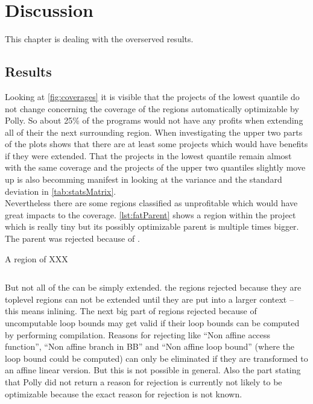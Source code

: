 \chapter{Discussion}
This chapter is dealing with the overserved results.

\section{Results}
Looking at \autoref{fig:coverages} it is visible that the projects of the lowest quantile do not change concerning the coverage of the regions automatically optimizable by Polly.
So about 25\% of the programs would not have any profits when extending all of their \scops the next surrounding region.
When investigating the upper two parts of the plots shows that there are at least some projects which would have benefits if they were extended.
That the projects in the lowest quantile remain almost with the same coverage and the projects of the upper two quantiles slightly move up is also becomming manifest in looking at the variance and the standard deviation in \autoref{tab:statsMatrix}.\\
Nevertheless there are some regions classified as unprofitable which would have great impacts to the coverage.
\autoref{lst:fatParent} shows a region within the project  which is really tiny but its possibly optimizable parent is multiple times bigger.
The parent was rejected because of .\\
\begin{code}
    \caption{A region of XXX}
    \inputminted{c++}{cpp/fatParent.cpp}
    \label{lst:fatParent}
\end{code}
But not all of the \scops can be simply extended.
\Eg the regions rejected because they are toplevel regions can not be extended until they are put into a larger context -- this means inlining.
The next big part of regions rejected because of uncomputable loop bounds may get valid if their loop bounds can be computed \eg by performing \jit compilation.
Reasons for rejecting like \enquote{Non affine access function}, \enquote{Non affine branch in BB} and \enquote{Non affine loop bound} (where the loop bound could be computed) can only be eliminated if they are transformed to an affine linear version.
But this is not possible in general. 
Also the part stating that Polly did not return a reason for rejection is currently not likely to be optimizable because the exact reason for rejection is not known.

